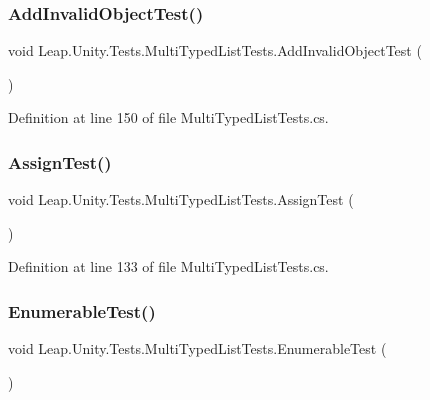 \subsubsection{\texorpdfstring{AddInvalidObjectTest()}{AddInvalidObjectTest()}}
{\footnotesize\ttfamily void Leap.\+Unity.\+Tests.\+Multi\+Typed\+List\+Tests.\+Add\+Invalid\+Object\+Test (\begin{DoxyParamCaption}{ }\end{DoxyParamCaption})}



Definition at line 150 of file Multi\+Typed\+List\+Tests.\+cs.

\mbox{\label{class_leap_1_1_unity_1_1_tests_1_1_multi_typed_list_tests_a5e1c771c9f6a127947ded55b42e4101c}} 
\subsubsection{\texorpdfstring{AssignTest()}{AssignTest()}}
{\footnotesize\ttfamily void Leap.\+Unity.\+Tests.\+Multi\+Typed\+List\+Tests.\+Assign\+Test (\begin{DoxyParamCaption}{ }\end{DoxyParamCaption})}



Definition at line 133 of file Multi\+Typed\+List\+Tests.\+cs.

\mbox{\label{class_leap_1_1_unity_1_1_tests_1_1_multi_typed_list_tests_a57f2fc72968e11d119b250d4294c836f}} 
\subsubsection{\texorpdfstring{EnumerableTest()}{EnumerableTest()}}
{\footnotesize\ttfamily void Leap.\+Unity.\+Tests.\+Multi\+Typed\+List\+Tests.\+Enumerable\+Test (\begin{DoxyParamCaption}{ }\end{DoxyParamCaption})}



